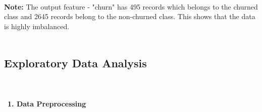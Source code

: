 \documentclass[a4paper, 10pt, conference]{ieeeconf}      %
\begin{document}
\\\textbf{Note:} The output feature - "churn" has  495 records which belongs to the churned class and 2645 records belong to the non-churned class. This shows that the data is highly imbalanced.
\\\
\subsection{\textbf{ Exploratory Data Analysis}}
\\\
\\\
\textbf{1. Data Preprocessing}
\end{document}
